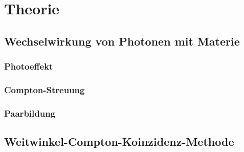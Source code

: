 \section{Theorie}

\subsection{Wechselwirkung von Photonen mit Materie}

\subsubsection{Photoeffekt}

\subsubsection{Compton-Streuung}

\subsubsection{Paarbildung}

\subsection{Weitwinkel-Compton-Koinzidenz-Methode}
